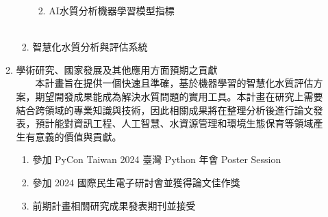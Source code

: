 \documentclass[12pt,a4paper]{article}
\begin{document}
\begin{enumerate}
\begin{enumerate}[label=\arabic*.]
\begin{enumerate}[label=3-2-\arabic*.]
\begin{enumerate}[label=\Alph*.]
\begin{figure}[H]
                    \end{figure}
            \item AI水質分析機器學習模型指標\\
                　　
            \end{enumerate}
        \item 智慧化水質分析與評估系統\\
    \end{enumerate}
\item 學術研究、國家發展及其他應用方面預期之貢獻\\
　　本計畫旨在提供一個快速且準確，基於機器學習的智慧化水質評估方案，期望開發成果能成為解決水質問題的實用工具。本計畫在研究上需要結合跨領域的專業知識與技術，因此相關成果將在整理分析後進行論文發表，預計能對資訊工程、人工智慧、水資源管理和環境生態保育等領域產生有意義的價值與貢獻。
    \begin{enumerate}[label=3-3-\arabic*.]
        \item 參加 PyCon Taiwan 2024 臺灣 Python 年會 Poster Session
        \item 參加 2024 國際民生電子研討會並獲得論文佳作獎
        \item 前期計畫相關研究成果發表期刊並接受
    \end{enumerate}
\end{enumerate}


\end{enumerate}
\end{document}
